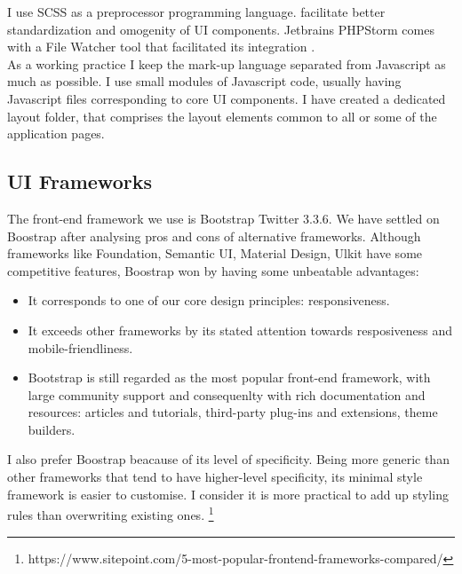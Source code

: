 I use SCSS as a preprocessor programming language.  facilitate better standardization and omogenity of UI components. Jetbrains PHPStorm comes with a File Watcher tool that facilitated its integration .\\

As a working practice I keep the mark-up language separated from Javascript as much as possible. I use small modules of Javascript code, usually having Javascript files corresponding to core UI components.
I have created a dedicated layout folder, that comprises the layout elements common to all or some of the application pages. 

\subsection{UI Frameworks} 

The front-end framework we use is Bootstrap Twitter 3.3.6. We have settled on Boostrap after analysing pros and cons of alternative frameworks.
Although frameworks like Foundation, Semantic UI, Material Design, Ulkit have some competitive features, Boostrap won by having some unbeatable advantages: 

\begin{itemize}
	\item It corresponds to one of our core design principles: responsiveness. 
	\item It exceeds other frameworks by its stated attention towards resposiveness and mobile-friendliness.
	\item Bootstrap is still regarded as the most popular front-end framework, with large community support and consequenlty with rich documentation and resources: articles and tutorials, third-party plug-ins and extensions, theme builders.\\

\end{itemize}

I also prefer Boostrap beacause of its level of specificity. Being more generic than other frameworks that tend to have higher-level specificity, its minimal style framework is easier to customise. I consider it is more practical to add up styling rules than overwriting existing ones. 
\footnote{https://www.sitepoint.com/5-most-popular-frontend-frameworks-compared/}\\

